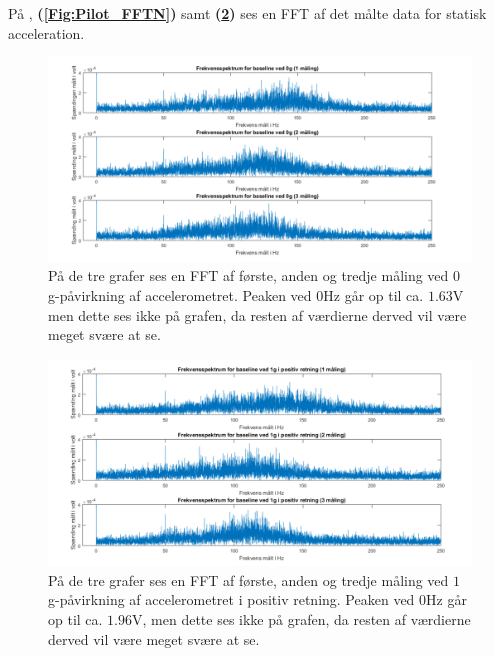 \noindent På , \textbf{(\ref{Fig:Pilot_FFTN})} samt \textbf{(\ref{Fig:Pilot_FFTP})} ses en FFT af det målte data for statisk acceleration.
\begin{figure}[H]
	\centering
	\includegraphics[scale=0.5]{figures/cProblemloesning/Pilotforsoeg_Frekvens0.png}
	\caption{På de tre grafer ses en FFT af første, anden og tredje måling ved $0$ g-påvirkning af accelerometret. Peaken ved $0$Hz går op til ca. $1.63$V men dette ses ikke på grafen, da resten af værdierne derved vil være meget svære at se.}
	\label{Fig:Pilot_FFT0}
\end{figure}
\begin{figure}[H]
	\centering
	\includegraphics[scale=0.5]{figures/cProblemloesning/Pilotforsoeg_FrekvensP.png}
	\caption{På de tre grafer ses en FFT af første, anden og tredje måling ved $1$ g-påvirkning af accelerometret i positiv retning. Peaken ved $0$Hz går op til ca. $1.96$V, men dette ses ikke på grafen, da resten af værdierne derved vil være meget svære at se.}
	\label{Fig:Pilot_FFTP}
\end{figure}
